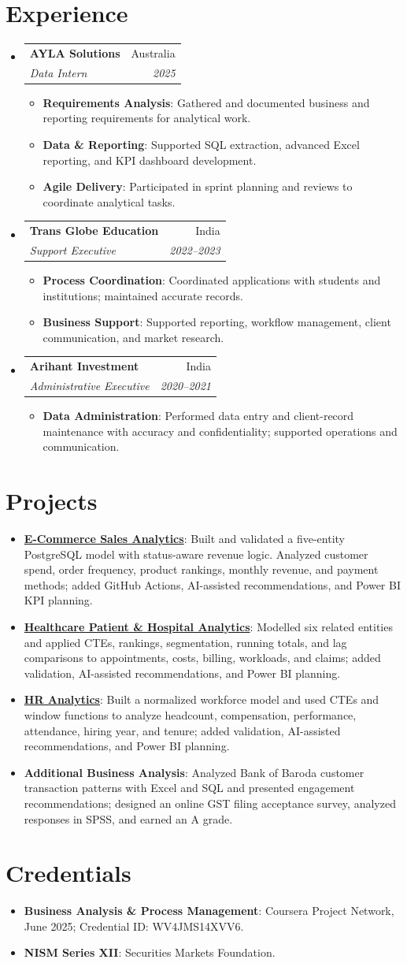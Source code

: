 \documentclass[letterpaper,11pt]{article}
\makeatletter
\newcommand{\resumeItem}[2]{
  \item\small{\textbf{#1}: #2\vspace{-2pt}}
}
\newcommand{\resumeSubheading}[4]{
  \vspace{-1pt}\item
  \begin{tabular*}{0.97\textwidth}{l@{\extracolsep{\fill}}r}
    \textbf{#1} & #2 \\
    \textit{\small #3} & \textit{\small #4} \\
  \end{tabular*}\vspace{-5pt}
}
\newcommand{\resumeProject}[2]{
  \item\small{\textbf{#1}: #2\vspace{-2pt}}
}
\newcommand{\resumeSubHeadingListStart}{\begin{itemize}[leftmargin=*,topsep=1pt,itemsep=2pt,parsep=0pt,partopsep=0pt]}
\newcommand{\resumeSubHeadingListEnd}{\end{itemize}\vspace{-2pt}}
\newcommand{\resumeItemListStart}{\begin{itemize}[leftmargin=1.2em,topsep=1pt,itemsep=0pt,parsep=0pt,partopsep=0pt]}
\newcommand{\resumeItemListEnd}{\end{itemize}\vspace{-1pt}}
\makeatother
\begin{document}
\section{Experience}
\resumeSubHeadingListStart
  \resumeSubheading
    {AYLA Solutions}{Australia}
    {Data Intern}{2025}
    \resumeItemListStart
      \resumeItem{Requirements Analysis}{Gathered and documented business and reporting requirements for analytical work.}
      \resumeItem{Data \& Reporting}{Supported SQL extraction, advanced Excel reporting, and KPI dashboard development.}
      \resumeItem{Agile Delivery}{Participated in sprint planning and reviews to coordinate analytical tasks.}
    \resumeItemListEnd
  \resumeSubheading
    {Trans Globe Education}{India}
    {Support Executive}{2022--2023}
    \resumeItemListStart
      \resumeItem{Process Coordination}{Coordinated applications with students and institutions; maintained accurate records.}
      \resumeItem{Business Support}{Supported reporting, workflow management, client communication, and market research.}
    \resumeItemListEnd
  \resumeSubheading
    {Arihant Investment}{India}
    {Administrative Executive}{2020--2021}
    \resumeItemListStart
      \resumeItem{Data Administration}{Performed data entry and client-record maintenance with accuracy and confidentiality; supported operations and communication.}
    \resumeItemListEnd
\resumeSubHeadingListEnd

\section{Projects}
\resumeSubHeadingListStart
  \resumeProject{\href{https://github.com/jainalimehta/Ecommerce-Sales-Analytics}{E-Commerce Sales Analytics}}{Built and validated a five-entity PostgreSQL model with status-aware revenue logic. Analyzed customer spend, order frequency, product rankings, monthly revenue, and payment methods; added GitHub Actions, AI-assisted recommendations, and Power BI KPI planning.}
  \resumeProject{\href{https://github.com/jainalimehta/Healthcare-Analytics}{Healthcare Patient \& Hospital Analytics}}{Modelled six related entities and applied CTEs, rankings, segmentation, running totals, and lag comparisons to appointments, costs, billing, workloads, and claims; added validation, AI-assisted recommendations, and Power BI planning.}
  \resumeProject{\href{https://github.com/jainalimehta/HR-Analytics}{HR Analytics}}{Built a normalized workforce model and used CTEs and window functions to analyze headcount, compensation, performance, attendance, hiring year, and tenure; added validation, AI-assisted recommendations, and Power BI planning.}
  \resumeProject{Additional Business Analysis}{Analyzed Bank of Baroda customer transaction patterns with Excel and SQL and presented engagement recommendations; designed an online GST filing acceptance survey, analyzed responses in SPSS, and earned an A grade.}
\resumeSubHeadingListEnd

\section{Credentials}
\resumeSubHeadingListStart
  \resumeProject{Business Analysis \& Process Management}{Coursera Project Network, June 2025; Credential ID: WV4JMS14XVV6.}
  \resumeProject{NISM Series XII}{Securities Markets Foundation.}
\resumeSubHeadingListEnd
\end{document}
